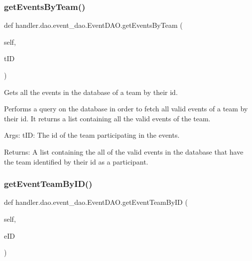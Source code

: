 \subsubsection{\texorpdfstring{get\+Events\+By\+Team()}{getEventsByTeam()}}
{\footnotesize\ttfamily def handler.\+dao.\+event\+\_\+dao.\+Event\+D\+A\+O.\+get\+Events\+By\+Team (\begin{DoxyParamCaption}\item[{}]{self,  }\item[{}]{t\+ID }\end{DoxyParamCaption})}

\begin{DoxyVerb}Gets all the events in the database of a  
team by their id.

Performs a query on the database in order to fetch
all valid events of a team by their id. It returns 
a list containing all the valid events of the team.

Args:
    tID: The id of the team participating in the events.

Returns:
    A list containing the all of the valid events in 
    the database that have the team identified by their 
    id as a participant.
\end{DoxyVerb}
 \mbox{\label{classhandler_1_1dao_1_1event__dao_1_1_event_d_a_o_a1f9f80d3b5442b3732c5cf63049cdd8c}} 
\subsubsection{\texorpdfstring{get\+Event\+Team\+By\+I\+D()}{getEventTeamByID()}}
{\footnotesize\ttfamily def handler.\+dao.\+event\+\_\+dao.\+Event\+D\+A\+O.\+get\+Event\+Team\+By\+ID (\begin{DoxyParamCaption}\item[{}]{self,  }\item[{}]{e\+ID }\end{DoxyParamCaption})}

